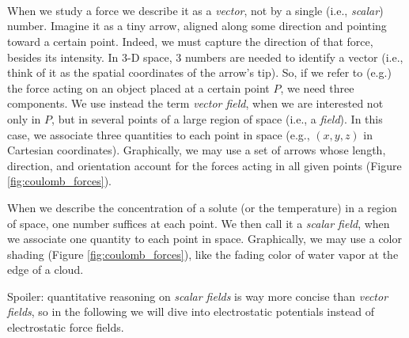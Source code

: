 \\
\begin{svgraybox}
	\\
	\\
When we study a force we describe it as a \textit{vector}, not by a single (i.e., \textit{scalar}) number. Imagine it as a tiny arrow, aligned along some direction and pointing toward a certain point. Indeed, we must capture the direction of that force, besides its intensity. In 3-D space, 3 numbers are needed to identify a vector (i.e., think of it as the spatial coordinates of the arrow's tip). So, if we refer to (e.g.) the force acting on an object placed at a certain point \(P\), we need three components. 
We use instead the term \textit{vector field}, when we are interested not only in \( P \), but in several points of a large region of space (i.e., a \textit{field}). In this case, we associate three quantities to each point in space (e.g., \( (x,y,z) \) in Cartesian coordinates). Graphically, we may use a set of arrows whose length, direction, and orientation account for the forces acting in all given points (Figure \ref{fig:coulomb_forces}).

When we describe the concentration of a solute (or the temperature) in a region of space, one number suffices at each point. We then call it a \textit{scalar field}, when we associate one quantity to each point in space. Graphically, we may use a color shading (Figure \ref{fig:coulomb_forces}), like the fading color of water vapor at the edge of a cloud. 

Spoiler: quantitative reasoning on \textit{scalar fields} is way more concise than \textit{vector fields}, so in the following we will dive into electrostatic potentials instead of electrostatic force fields. 
\end{svgraybox}

